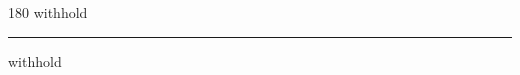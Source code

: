 
\begin{frame}
\begin{center}
\begin{turn}{180}
{\fontsize{2.5cm}{1em}\selectfont withhold}
\end{turn}
\vspace{1em}\par  
\hrule
\vspace{1em}\par  
{\fontsize{2.5cm}{1em}\selectfont withhold}
\end{center}
\end{frame}
